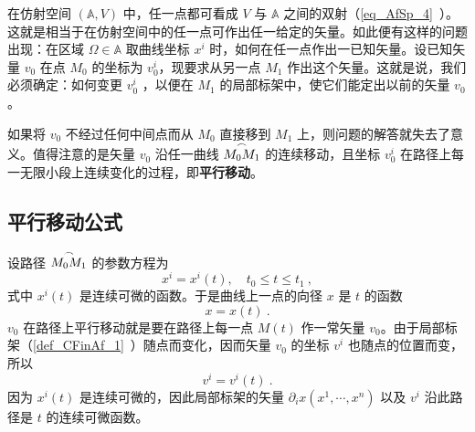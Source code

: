 


在仿射空间 $(\mathbb A,V)$ 中，任一点都可看成 $V$ 与 $\mathbb A$ 之间的双射（\autoref{eq_AfSp_4}~）。这就是相当于在仿射空间中的任一点可作出任一给定的矢量。如此便有这样的问题出现：在区域 $\Omega\in\mathbb A$ 取曲线坐标 $x^i$ 时，如何在任一点作出一已知矢量。设已知矢量 $v_0$ 在点 $M_0$ 的坐标为 $v_0^i$，现要求从另一点 $M_1$ 作出这个矢量。这就是说，我们必须确定：如何变更 $v_0^i$ ，以便在 $M_1$ 的局部标架中，使它们能定出以前的矢量 $v_0$。

如果将 $v_0$ 不经过任何中间点而从 $M_0$ 直接移到 $M_1$ 上，则问题的解答就失去了意义。值得注意的是矢量 $v_0$ 沿任一曲线 $\overset{\Huge\frown}{M_0M_1}$ 的连续移动，且坐标 $v_0^i$ 在路径上每一无限小段上连续变化的过程，即\textbf{平行移动}。
\subsection{平行移动公式}
设路径 $\overset{\Huge\frown}{M_0M_1}$ 的参数方程为
\begin{equation}
x^i=x^i(t),\quad t_0\leq t\leq t_1~,
\end{equation}
式中 $x^i(t)$ 是连续可微的函数。于是曲线上一点的向径 $x$ 是 $t$ 的函数
\begin{equation}
x=x(t)~.
\end{equation}
$v_0$ 在路径上平行移动就是要在路径上每一点 $M(t)$ 作一常矢量 $v_0$。由于局部标架（\autoref{def_CFinAf_1}~）随点而变化，因而矢量 $v_0$ 的坐标 $v^i$ 也随点的位置而变，所以
\begin{equation}
v^i=v^i(t)~.
\end{equation}
因为 $x^i(t)$ 是连续可微的，因此局部标架的矢量 $\partial_i x(x^1,\cdots,x^n)$ 以及 $v^i$ 沿此路径是 $t$ 的连续可微函数。

